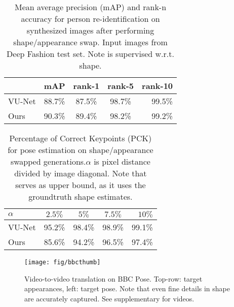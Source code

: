 \begin{table}
	\caption{Mean average precision (mAP) and rank-n accuracy for person re-identification on synthesized images after performing shape/appearance swap. Input images from Deep Fashion test set. Note \cite{Esser:2018ue} is supervised w.r.t. shape.}
	\label{tab:reid}
	\begin{tabular}{l|cccr}
		\hline
		& mAP & rank-1 & rank-5 & rank-10 \\ \hline
		VU-Net \cite{Esser:2018ue} & 88.7\% & 87.5\% & {98.7}\% & {99.5}\% \\
		Ours & {90.3}\% & {89.4}\% &{98.2}\% & {99.2}\% \\ \hline
	\end{tabular}
\end{table}
\begin{table}
	\caption{Percentage of Correct Keypoints (PCK) for pose estimation on shape/appearance swapped generations.\;$\alpha$ is pixel distance divided by image diagonal. Note that \cite{Esser:2018ue} serves as upper bound, as it uses the groundtruth shape estimates.}
	\label{tab:pose}
	\begin{tabular}{l|cccr}
		\hline
		$\alpha$ & $2.5\%$ &  $5\%$ & $7.5\%$ & $10\%$ \\ \hline
		VU-Net \cite{Esser:2018ue} & {95.2}\% & {98.4}\% & {98.9}\% & {99.1}\% \\
		Ours & 85.6\% & 94.2\% &96.5\% & 97.4\% \\ \hline
	\end{tabular}
\end{table}
%
\begin{figure}[t]
	\centering
	\texttt{[image: fig/bbcthumb]}
	\caption{Video-to-video translation on BBC Pose. Top-row: target appearances, left: target pose.
	Note that even fine details in shape are accurately captured. See supplementary for videos.}
	\label{fig:bbcthumb}
\end{figure}

